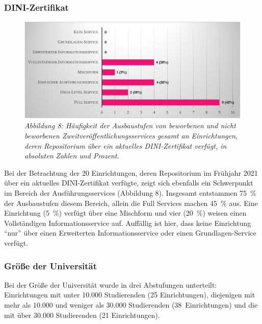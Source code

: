 \documentclass[a4paper,
fontsize=11pt,
oneside,
numbers=noperiodatend,
parskip=half-,
bibliography=totoc,
final
]{scrartcl}
\begin{document}
\hypertarget{dini-zertifikat}{%
\subsubsection{DINI-Zertifikat}\label{dini-zertifikat}}

\begin{figure}[h!]
\centering
\includegraphics[width=.9\textwidth]{img/abb8.png}
\caption{\textit{Abbildung 8: Häufigkeit der Ausbaustufen von beworbenen und
nicht beworbenen Zweitveröffentlichungsservices gesamt an Einrichtungen,
deren Repositorium über ein aktuelles DINI-Zertifikat verfügt, in
absoluten Zahlen und Prozent.}}
\end{figure}

Bei der Betrachtung der 20 Einrichtungen, deren Repositorium im Frühjahr
2021 über ein aktuelles DINI-Zertifikat verfügte, zeigt sich ebenfalls
ein Schwerpunkt im Bereich der Ausführungsservices (Abbildung 8).
Insgesamt entstammen 75~\% der Ausbaustufen diesem Bereich, allein die
Full Services machen 45~\% aus. Eine Einrichtung (5~\%) verfügt über
eine Mischform und vier (20~\%) weisen einen Vollständigen
Informationsservice auf. Auffällig ist hier, dass keine Einrichtung
\enquote{nur} über einen Erweiterten Informationsservice oder einen
Grundlagen-Service verfügt.

\hypertarget{gruxf6uxdfe-der-universituxe4t}{%
\subsubsection{Größe der
Universität}\label{gruxf6uxdfe-der-universituxe4t}}

Bei der Größe der Universität wurde in drei Abstufungen unterteilt:
Einrichtungen mit unter 10.000 Studierenden (25 Einrichtungen),
diejenigen mit mehr als 10.000 und weniger als 30.000 Studierenden
(38~Einrichtungen) und die mit über 30.000 Studierenden (21
Einrichtungen).
\end{document}
